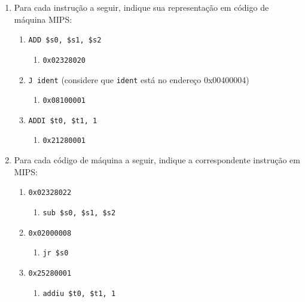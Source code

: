 \documentclass{article}
\begin{document}
\begin{enumerate}
\item \large Para cada instrução a seguir, indique sua representação em código de máquina MIPS:

\begin{spacing}{1.5}
\begin{enumerate}
\item \verb|ADD $s0, $s1, $s2|

\begin{enumerate}
\item \verb|0x02328020|%
\end{enumerate}

\item \verb|J ident| (considere que \verb|ident| está no endereço 0x00400004)

\begin{enumerate}
\item \verb|0x08100001|%
\end{enumerate}

\item \verb|ADDI $t0, $t1, 1|

\begin{enumerate}
\item \verb|0x21280001|%
\end{enumerate}

\end{enumerate}
\end{spacing}
\bigskip

\item \large Para cada código de máquina a seguir, indique a correspondente instrução em MIPS:

\begin{spacing}{1.5}
\begin{enumerate}
\item \verb|0x02328022|

\begin{enumerate}
\item \verb|sub $s0, $s1, $s2|%
\end{enumerate}

\item \verb|0x02000008|

\begin{enumerate}
\item \verb|jr $s0|%
\end{enumerate}

\item \verb|0x25280001|

\begin{enumerate}
\item \verb|addiu $t0, $t1, 1|%
\end{enumerate}


\end{enumerate}
\end{spacing}
\end{enumerate}
\end{document}
